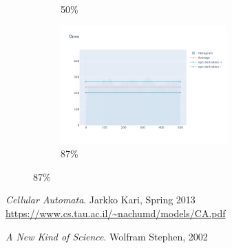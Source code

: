 \documentclass[12pt, fleqn]{report}                             %
\theoremstyle{break}                                            %
\begin{document}
\begin{figure}[h!]
\begin{subfigure}[b]{0.4\linewidth}
            \caption{50\%}
          \end{subfigure}
          \begin{subfigure}[b]{0.4\linewidth}
            \includegraphics[width=0.7\textwidth]{Images/54/dia-d.png}
            \caption{87\%}
          \end{subfigure}
        \end{figure}

\begin{thebibliography}{10}

      \textit{Cellular Automata}. 
      Jarkko Kari, Spring 2013 \\
      \url{https://www.cs.tau.ac.il/~nachumd/models/CA.pdf}

      \textit{A New Kind of Science}. 
      Wolfram Stephen, 2002 \\

\end{thebibliography}
\end{document}
